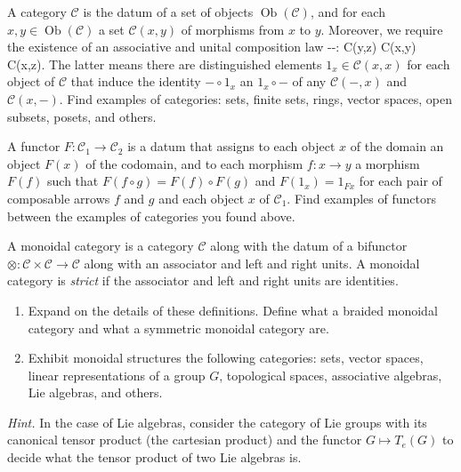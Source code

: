 \documentclass[fleqn, a4paper, twoside]{article}
\makeatletter
\newcommand{\0}{\langle 0\rangle}
\let\[\@undefined
\DeclareRobustCommand{\[}{\begin{equation}}%
\let\]\@undefined
\DeclareRobustCommand{\]}{\end{equation}}%
\theoremstyle{mytheorem}
\theoremstyle{introthm}
\theoremstyle{mydefinition}
\theoremstyle{mydefinition2}
\theoremstyle{plain} %
\newcommand{\?}{\,?\,}
\theoremstyle{mytheorem}
\theoremstyle{plain} %
\makeatother
\begin{document}
\begin{question} A category $\mathcal C$ is the datum of
a set of objects $\operatorname{Ob}(\mathcal{C})$, and
for each $x,y\in \operatorname{Ob}(\mathcal{C})$ a
set $\mathcal C(x,y)$ of morphisms from $x$ to $y$.
Moreover, we require the existence of an associative
and unital composition law
\[-\circ -: \mathcal C(y,z) \times  \mathcal C(x,y) 
	\longrightarrow \mathcal C(x,z). \] 
	The latter means there are distinguished elements
	$1_x\in \mathcal{C}(x,x)$ for each object of $\mathcal{C}$
	that induce the identity $-\circ 1_x$ an $1_x\circ -$
	of any $\mathcal{C}(-,x)$ and $\mathcal{C}(x,-)$.
	Find examples of categories: sets, finite sets,
	rings, vector spaces, open subsets, posets, and 
	others.
\end{question}

\begin{question} A functor $F: \mathcal{C}_1\longrightarrow 
\mathcal{C}_2$ is a datum that assigns to each object
$x$ of the domain an object $F(x)$ of the codomain,
and to each morphism $f:x\to y$ a morphism $F(f)$ such
that $F(f\circ g) = F(f) \circ F(g)$ and $F(1_x) = 1_{Fx}$
for each pair of composable arrows $f$ and $g$ and each
object $x$ of $\mathcal C_1$. Find examples of functors
between the examples of categories you found above.

\end{question}
\begin{question} A monoidal category is a category $\mathcal C$ 
along with the datum of a bifunctor $\otimes :
\mathcal{C}\times \mathcal{C}\longrightarrow \mathcal{C}$
along with an associator and left and right units. 
A monoidal category is \emph{strict} if the associator and left
and right units are identities.
\begin{enumerate}
\item Expand on the details of these definitions. Define what
a braided monoidal category and what a symmetric monoidal category are.
\item Exhibit monoidal
structures the following categories: sets, vector spaces,
linear representations of a group $G$, topological spaces,
associative algebras, Lie algebras, and others.
\end{enumerate}
 \emph{Hint.} In the case of Lie algebras,
 consider the category of Lie groups with its
 canonical tensor product (the cartesian product) 
 and the functor $G\longmapsto T_e(G)$ to decide
 what the tensor product of two Lie algebras is.
\end{question}
\end{document}
